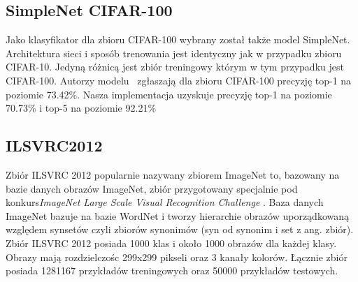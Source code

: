 \documentclass[
    left=2.5cm,         %
    right=2.5cm,        %
    top=2.5cm,          %
    bottom=3cm,         %
    bindingoffset=6mm,  %
    nohyphenation=false %
]{eiti/eiti-thesis}
\begin{document}
        \subsection{SimpleNet CIFAR-100}
        Jako klasyfikator dla zbioru CIFAR-100 wybrany został także model SimpleNet. Architektura sieci i sposób trenowania
        jest identyczny jak w przypadku zbioru CIFAR-10. Jedyną różnicą jest zbiór treningowy którym w tym przypadku jest CIFAR-100.
        Autorzy modelu~\cite{DBLP:journals/corr/HasanPourRVS16} zgłaszają dla zbioru CIFAR-100 precyzję top-1 na poziomie 73.42\%.
        Nasza implementacja uzyskuje precyzję top-1 na poziomie 70.73\% i top-5 na poziomie 92.21\%


    \subsection{ILSVRC2012}\label{ILSVRC2012}
        Zbiór ILSVRC 2012 popularnie nazywany zbiorem ImageNet to, bazowany na bazie danych obrazów ImageNet, zbiór
        przygotowany specjalnie pod konkurs\textit{ImageNet Large Scale Visual Recognition Challenge} \cite{ILSVRC15}.
        Baza danych ImageNet bazuje na bazie WordNet i tworzy hierarchie obrazów uporządkowaną względem synsetów
        czyli zbiorów synonimów (syn od synonim i set z ang. zbiór). Zbiór ILSVRC 2012 posiada 1000 klas i około 1000
        obrazów dla każdej klasy. Obrazy mają rozdzielczośc 299x299 pikseli oraz 3 kanały kolorów. Łącznie zbiór posiada
        1281167 przykładów treningowych oraz 50000 przykładów testowych.
\end{document}
